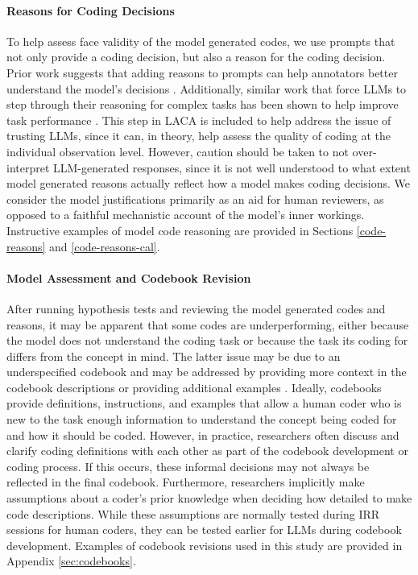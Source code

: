 \documentclass{article}
\begin{document}
\paragraph{Reasons for Coding Decisions}
To help assess face validity of the model generated codes, we use prompts that not only provide a coding decision, but also a reason for the coding decision. Prior work suggests that adding reasons to prompts can help annotators better understand the model’s decisions \cite{elsherief_latent_2021, zhu_can_2023}.  Additionally, similar work that force LLMs to step through their reasoning for complex tasks has been shown to help improve task performance \cite{wei_chain--thought_2023}.  This step in LACA is included to help address the issue of trusting LLMs, since it can, in theory, help assess the quality of coding at the individual observation level.  However, caution should be taken to not over-interpret LLM-generated responses, since it is not well understood to what extent model generated reasons actually reflect how a model makes coding decisions.  We consider the model justifications primarily as an aid for human reviewers, as opposed to a faithful mechanistic account of the model's inner workings.  Instructive examples of model code reasoning are provided in Sections \ref{code-reasons} and \ref{code-reasons-cal}.

\paragraph{Model Assessment and Codebook Revision}
After running hypothesis tests and reviewing the model generated codes and reasons, it may be apparent that some codes are underperforming, either because the model does not understand the coding task or because the task its coding for differs from the concept in mind.  The latter issue may be due to an underspecified codebook and may be addressed by providing more context in the codebook descriptions or providing additional examples \cite{xiao_supporting_2023}.  Ideally, codebooks provide definitions, instructions, and examples that allow a human coder who is new to the task enough information to understand the concept being coded for and how it should be coded.  However, in practice, researchers often discuss and clarify coding definitions with each other as part of the codebook development or coding process.  If this occurs, these informal decisions may not always be reflected in the final codebook.  Furthermore, researchers implicitly make assumptions about a coder’s prior knowledge when deciding how detailed to make code descriptions.  While these assumptions are normally tested during IRR sessions for human coders, they can be tested earlier for LLMs during codebook development.  Examples of codebook revisions used in this study are provided in Appendix \ref{sec:codebooks}. 
\end{document}

